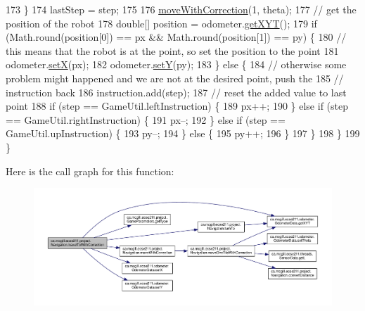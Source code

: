 \begin{DoxyCode}
173       \}
174       lastStep = step;
175 
176       \hyperlink{classca_1_1mcgill_1_1ecse211_1_1project_1_1_navigation_a48eeb9ae2da23664421e8da5642054c7}{moveWithCorrection}(1, theta);
177       \textcolor{comment}{// get the position of the robot}
178       \textcolor{keywordtype}{double}[] position = odometer.\hyperlink{classca_1_1mcgill_1_1ecse211_1_1odometer_1_1_odometer_data_a8f40f0264c68f0cbed4fff1723ae7863}{getXYT}();
179       \textcolor{keywordflow}{if} (Math.round(position[0]) == px && Math.round(position[1]) == py) \{
180         \textcolor{comment}{// this means that the robot is at the point, so set the position to the point}
181         odometer.\hyperlink{classca_1_1mcgill_1_1ecse211_1_1odometer_1_1_odometer_data_a2911d7215e47f3064defe016b46bfeef}{setX}(px);
182         odometer.\hyperlink{classca_1_1mcgill_1_1ecse211_1_1odometer_1_1_odometer_data_a82986438cd462e66520bc62bb4bd2b75}{setY}(py);
183       \} \textcolor{keywordflow}{else} \{
184         \textcolor{comment}{// otherwise some problem might happened and we are not at the desired point, push the}
185         \textcolor{comment}{// instruction back}
186         instruction.add(step);
187         \textcolor{comment}{// reset the added value to last point}
188         \textcolor{keywordflow}{if} (step == GameUtil.leftInstruction) \{
189           px++;
190         \} \textcolor{keywordflow}{else} \textcolor{keywordflow}{if} (step == GameUtil.rightInstruction) \{
191           px--;
192         \} \textcolor{keywordflow}{else} \textcolor{keywordflow}{if} (step == GameUtil.upInstruction) \{
193           py--;
194         \} \textcolor{keywordflow}{else} \{
195           py++;
196         \}
197       \}
198     \}
199   \}
\end{DoxyCode}
Here is the call graph for this function\+:
\nopagebreak
\begin{figure}[H]
\begin{center}
\leavevmode
\includegraphics[width=350pt]{classca_1_1mcgill_1_1ecse211_1_1project_1_1_navigation_ae7230e905494002087416294f12cae6a_cgraph}
\end{center}
\end{figure}
